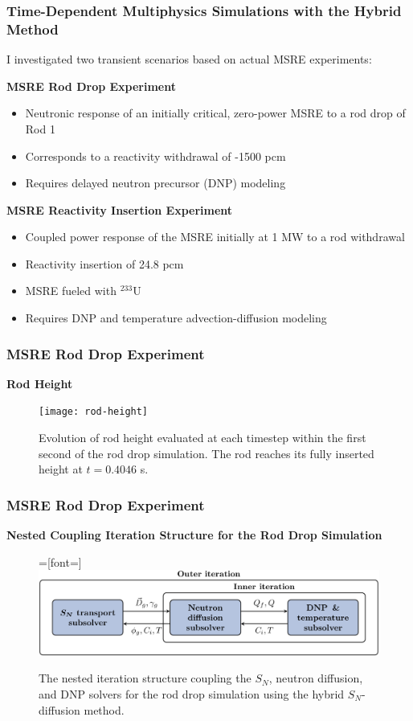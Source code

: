 \begin{frame}
  \frametitle{Time-Dependent Multiphysics Simulations with the Hybrid Method}
  I investigated two transient scenarios based on actual MSRE experiments:
  \begin{block}{\textbf{MSRE Rod Drop Experiment}}
    \begin{itemize}
      \item Neutronic response of an initially critical, zero-power MSRE to a
        rod drop of Rod 1 \cite{prince_zero-power_1968}
      \item Corresponds to a reactivity withdrawal of -1500 pcm
      \item Requires delayed neutron precursor (DNP) modeling
    \end{itemize}
  \end{block}
  \begin{block}{\textbf{MSRE Reactivity Insertion Experiment}}
    \begin{itemize}
      \item Coupled power response of the MSRE initially at 1 MW to a rod
        withdrawal \cite{engel_zero-power_1972}
      \item Reactivity insertion of 24.8 pcm
      \item MSRE fueled with $^{233}$U
      \item Requires DNP and temperature advection-diffusion modeling
    \end{itemize}
  \end{block}
\end{frame}

\begin{frame}
  \frametitle{MSRE Rod Drop Experiment}
  \textbf{Rod Height}
  \begin{figure}[htb!]
    \centering
    \texttt{[image: rod-height]}
    \caption{Evolution of rod height evaluated at each timestep within the first second of the rod
    drop simulation. The rod reaches its fully inserted height at $t=0.4046$ s.}
    \label{fig:rod-height}
  \end{figure}
\end{frame}

\begin{frame}
  \frametitle{MSRE Rod Drop Experiment}
  \textbf{Nested Coupling Iteration Structure for the Rod Drop Simulation}
  \begin{figure}[t]
    =[font=\small]
    \centering
    \includegraphics[width=\columnwidth]{images/nest-1}
    \caption{The nested iteration structure coupling the $S_N$, neutron diffusion, and \gls{DNP}
    solvers for the rod drop simulation using the hybrid $S_N$-diffusion method.}
    \label{fig:rod-drop-coupling}
  \end{figure}
\end{frame}

